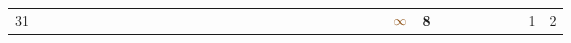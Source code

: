 \begin{landscape}
\begin{table}
\begin{adjustwidth}{-2.6cm}{}
{\begin{tabular}{l|lllllllllllllllllllllllllllllllll|ll}
		31   &            &                                                                 &                                                                 &                                                                 &                                                                 &                                                                 &                                                                 &                                                                 &                                                                 &                                                                 &                                                                 &                                                                 &                                                                 &                                                                 &                                                                 &                                                                 &                                                                 &                                                                 &                                                                 &                                                                 &                                                                 &                                                                 &                                                                 &                                                                 &                                                                 & $\textcolor[rgb]{0.541,0.29,0.043}{\infty}$ & \textbf{8}                                                      &                                                                 &                                                                 &                                                                 &                                                                 &                                                                 &                                                                 & 1          & 2           \\

\end{tabular}}
\end{adjustwidth}
\end{table}
\end{landscape}

